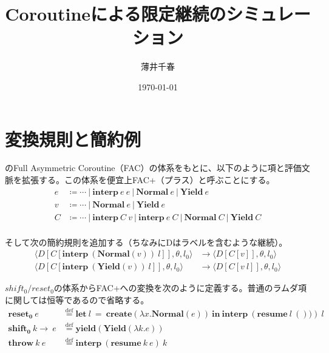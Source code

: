 \documentclass[a4j]{jsarticle}
\title{Coroutineによる限定継続のシミュレーション}
\date{\today}
\author{薄井千春}
\newcommand{\ra}{\rightarrow}
\newcommand{\interpp}[2]{\mathbf{interp}~#1~#2}
\newcommand{\resume}[2]{\mathbf{resume}~ #1 ~#2}
\newcommand{\shift}[2]{\mathbf{shift_0}~ #1\ra ~#2}
\newcommand{\create}[1]{\mathbf{create}\left(#1\right)}
\newcommand{\letin}[3]{\mathbf{let}~#1~=~#2~\mathbf{in}~#3}
\newcommand{\yield}[1]{\mathbf{yield}\left(#1\right)}
\newcommand{\fun}[2]{\lambda #1. #2}
\newcommand{\throw}[2]{\mathbf{throw}~#1~#2}
\newcommand{\defeq}{\overset{\text{def}}=}
\newcommand{\reset}{\mathbf{reset_0}}
\newcommand{\Normal}{\mathbf{Normal}}
\newcommand{\Yield}{\mathbf{Yield}}
\begin{document}
\maketitle
\section{変換規則と簡約例}
\cite{Materzok_Subtyping_2011}
\cite{sugiura}
\cite{Anton2010}のFull Asymmetric Coroutine（FAC）の体系をもとに、以下のように項と評価文脈を拡張する。この体系を便宜上FAC+（プラス）と呼ぶことにする。
\begin{align*}
  e &\coloneqq \cdots ~|~ \interpp{e}{e} ~|~ \Normal ~e ~|~ \Yield~e\\
  v &\coloneqq \cdots ~|~ \Normal~e ~|~ \Yield~e \\
  C &\coloneqq \cdots ~|~ \interpp{C}{v} ~|~ \interpp{e}{C} ~|~ \Normal ~C ~|~ \Yield ~C \\
\end{align*}

そして次の簡約規則を追加する（ちなみにDはラベルを含むような継続）。
\begin{align*}
  \langle D[C[\interpp{(\Normal(v))}{l}]], \theta, l_0 \rangle &\rightarrow \langle D[C[v]], \theta, l_0 \rangle \\
  \langle D[C[\interpp{(\Yield(v))}{l}]], \theta, l_0 \rangle &\rightarrow \langle D[C[v~l]], \theta, l_0 \rangle
\end{align*}

\(shift_0 / reset_0\)の体系からFAC+への変換を次のように定義する。普通のラムダ項に関しては恒等であるので省略する。
\begin{align*}
  \reset ~ e &\defeq \letin{l}
               {\create{ \fun{x}{\Normal(e)} } }
               {\interpp{\left(\resume{l}{())}\right)}
               {l}
               } \\
  \shift{k}{e} &\defeq \yield{\Yield(\fun{k}{e})} \\
  \throw{k}{e} &\defeq \interpp{(\resume{k}{e})}{k} \\
\end{align*}
\end{document}
